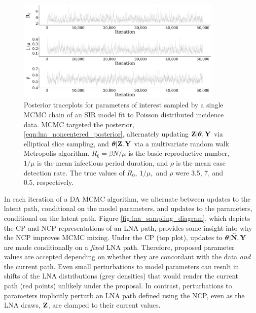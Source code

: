 \begin{figure}[!ht]
	\centering
	\includegraphics[width=0.9\textwidth]{figures/lna_noncentered_traces}
	\caption{Posterior traceplots for parameters of interest sampled by a single MCMC chain of an SIR model fit to Poisson distributed incidence data. MCMC targeted the posterior, \ref{eqn:lna_noncentered_posterior}, alternately updating $ \mathbf{Z}|\boldsymbol{\theta},\mathbf{Y} $ via elliptical slice sampling, and $ \boldsymbol{\theta}|\mathbf{Z},\mathbf{Y} $ via a multivariate random walk Metropolis algorithm. $ R_0 = \beta N / \mu$ is the basic reproductive number, $ 1/\mu $ is the mean infectious period duration, and $ \rho $ is the mean case detection rate. The true values of $ R_0,\ 1/\mu,$ and $ \rho $ were 3.5, 7, and 0.5, respectively.}
	\label{fig:lna_noncentered_traces}
\end{figure}

In each iteration of a DA MCMC algorithm, we alternate between updates to the latent path, conditional on the model parameters, and updates to the parameters, conditional on the latent path. Figure \ref{fig:lna_sampling_diagram}, which depicts the CP and NCP representations of an LNA path, provides some insight into why the NCP improves MCMC mixing. Under the CP (top plot), updates to $ \boldsymbol{\theta}|\widetilde{\mathbf{N}},\mathbf{Y} $ are made conditionally on a \textit{fixed} LNA path. Therefore, proposed parameter values are accepted depending on whether they are concordant with the data \textit{and} the current path. Even small perturbations to model parameters can result in shifts of the LNA distributions (grey densities) that would render the current path (red points) unlikely under the proposal. In contrast, perturbations to parameters implicitly perturb an LNA path defined using the NCP, even as the LNA draws, $ \mathbf{Z} $, are clamped to their current values. 

